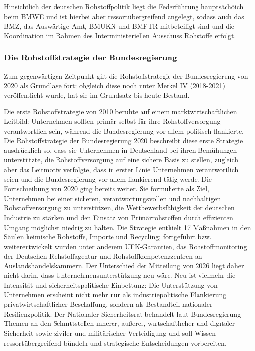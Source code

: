 \documentclass[12pt,a4paper,oneside]{book} %
\begin{document}
Hinsichtlich der deutschen Rohstoffpolitik liegt die Federführung hauptsächöich beim BMWE und ist hierbei aber ressortübergreifend angelegt, sodass auch das BMZ, das Auswärtige Amt, BMUKN und BMFTR mitbeteiligt sind und die Koordination im Rahmen des Interministeriellen Ausschuss Rohstoffe erfolgt.\autocite{Vom Dialog zur Lieferkette, S. 22}

\subsubsection{Die Rohstoffstrategie der Bundesregierung}
Zum gegenwärtigen Zeitpunkt gilt die Rohstoffstrategie der Bundesregierung von 2020 als Grundlage fort; obgleich diese noch unter Merkel IV (2018-2021) veröffentlicht wurde, hat sie im Grundsatz bis heute Bestand.

Die erste Rohstoffstrategie von 2010 beruhte auf einem marktwirtschaftlichen Leitbild: Unternehmen sollten primär selbst für ihre Rohstoffversorgung verantwortlich sein, während die Bundesregierung vor allem politisch flankierte. Die Rohstoffstrategie der Bundesregierung 2020 beschreibt diese erste Strategie ausdrücklich so, dass sie Unternehmen in Deutschland bei ihren Bemühungen unterstützte, die Rohstoffversorgung auf eine sichere Basis zu stellen, zugleich aber das Leitmotiv verfolgte, dass in erster Linie Unternehmen verantwortlich seien und die Bundesregierung vor allem flankierend tätig werde. Die Fortschreibung von 2020 ging bereits weiter. Sie formulierte als Ziel, Unternehmen bei einer sicheren, verantwortungsvollen und nachhaltigen Rohstoffversorgung zu unterstützen, die Wettbewerbsfähigkeit der deutschen Industrie zu stärken und den Einsatz von Primärrohstoffen durch effizienten Umgang möglichst niedrig zu halten. Die Strategie enthielt 17 Maßnahmen in den Säulen heimische Rohstoffe, Importe und Recycling; fortgeführt bzw. weiterentwickelt wurden unter anderem UFK-Garantien, das Rohstoffmonitoring der Deutschen Rohstoffagentur und Rohstoffkompetenzzentren an Auslandshandelskammern. Der Unterschied der Mitteilung von 2026 liegt daher nicht darin, dass Unternehmensunterstützung neu wäre. Neu ist vielmehr die Intensität und sicherheitspolitische Einbettung: Die Unterstützung von Unternehmen erscheint nicht mehr nur als industriepolitische Flankierung privatwirtschaftlicher Beschaffung, sondern als Bestandteil nationaler Resilienzpolitik. Der Nationaler Sicherheitsrat behandelt laut Bundesregierung Themen an den Schnittstellen innerer, äußerer, wirtschaftlicher und digitaler Sicherheit sowie ziviler und militärischer Verteidigung und soll Wissen ressortübergreifend bündeln und strategische Entscheidungen vorbereiten.
\end{document}

